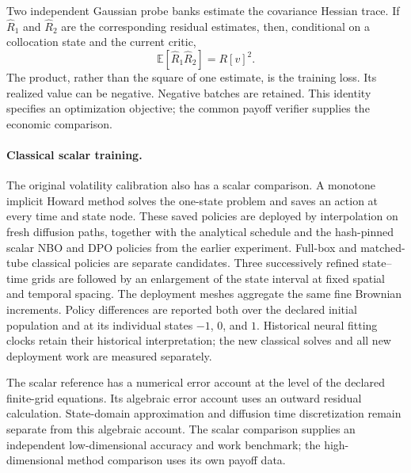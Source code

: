 Two independent Gaussian probe banks estimate the covariance Hessian trace.
If $\widehat R_1$ and $\widehat R_2$ are the corresponding residual estimates,
then, conditional on a collocation state and the current critic,
\begin{equation}
 \mathbb E[\widehat R_1\widehat R_2]=R[v]^2.
 \label{eq:r15-hjb-independent-traces}
\end{equation}
The product, rather than the square of one estimate, is the training loss.
Its realized value can be negative.  Negative batches are retained.  This
identity specifies an optimization objective; the common payoff verifier
supplies the economic comparison.

\paragraph*{Classical scalar training.}
The original volatility calibration also has a scalar comparison.  A monotone
implicit Howard method solves the one-state problem and saves an action at
every time and state node.  These saved policies are deployed by interpolation
on fresh diffusion paths, together with the analytical schedule and the
hash-pinned scalar NBO and DPO policies from the earlier experiment.  Full-box
and matched-tube classical policies are separate candidates.  Three successively
refined state--time grids are followed by an enlargement of the state interval
at fixed spatial and temporal spacing.  The deployment meshes aggregate the
same fine Brownian increments.  Policy differences are reported both over
the declared initial population and at its individual states $-1$, $0$, and
$1$.  Historical neural fitting clocks retain their historical interpretation;
the new classical solves and all new deployment work are measured separately.

The scalar reference has a numerical error account at the level of the
declared finite-grid equations.  Its algebraic error account uses an outward
residual calculation.  State-domain approximation and diffusion time
discretization remain separate from this algebraic account.  The scalar
comparison supplies an independent low-dimensional accuracy and work
benchmark; the high-dimensional method comparison uses its own payoff data.
